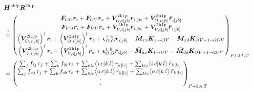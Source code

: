 \begin{align}
    &\bm{H}^{2 \mathrm{hlp}} \bm{R}^{2 \mathrm{hlp}}\\
& \color{red} \stackrel{?}{=} \color{black} \begin{pmatrix}
\bm{F}_{OO} \bm{r}_i + \bm{F}_{OV} \bm{r}_a + \bm{V}^{2 \mathrm{h1p}}_{O,i[jb]} \bm{r}_{i[jb]} + \bm{V}^{2 \mathrm{h1p}}_{O,i[jb]} \bm{\bar{r}}_{i[\bar{jb}]} \\
\bm{F}_{VO} \bm{r}_i + \bm{F}_{VV} \bm{r}_a + \bm{V}^{2 \mathrm{h1p}}_{V,i[jb]} \bm{r}_{i[jb]} + \bm{V}^{2 \mathrm{h1p}}_{V,i[jb]} \bm{\bar{r}}_{i[\bar{jb}]}  \\
\left(\bm{V}^{2 \mathrm{h1p}}_{O,i[jb]}\right)^{\dagger} \bm{r}_i + \left(\bm{V}^{2 \mathrm{h1p}}_{O,i[jb]}\right)^{\dagger} \bm{r}_a + \bm{\epsilon}^{1 \mathrm{~h}}_{O,O} \bm{r}_{i[jb]} - \tilde{\bm{M}}_{xx} \bm{K}_{1\rightarrow OV} - \tilde{\bm{M}}_{xd} \bm{K}_{OV+1\rightarrow 2OV} \\
\left(\bm{V}^{2 \mathrm{h1p}}_{V,i[jb]}\right)^{\dagger} \bm{r}_i + \left(\bm{V}^{2 \mathrm{h1p}}_{V,i[jb]}\right)^{\dagger} \bm{r}_a + \bm{\epsilon}^{1 \mathrm{~h}}_{O,O} \bm{\bar{r}}_{i[jb]} - \tilde{\bm{M}}_{dx} \bm{K}_{1\rightarrow OV} - \tilde{\bm{M}}_{dd} \bm{K}_{OV+1\rightarrow 2OV} \\
\end{pmatrix}_{P+2A,T} \\%
&= \begin{pmatrix}
\sum_{j} f_{i j}\,r_j + \sum_{b} f_{i b}\,r_b + \sum_{k l c} \bigl\langle i\,c | k\,l \bigr\rangle\,r_{k[l c]} + \sum_{k l c} \bigl\langle i\,c | k\,l \bigr\rangle\,\bar{r}_{k[l c]} \\
\sum_{j} f_{a j}\,r_j + \sum_{b} f_{a b}\,r_b + \sum_{k l c} \bigl\langle a\,c | k\,l \bigr\rangle\,r_{k[l c]} + \sum_{k l c} \bigl\langle a\,c | k\,l \bigr\rangle\,\bar{r}_{k[l c]} \\
\vdots
\end{pmatrix}_{P+2A,T}
\end{align}

